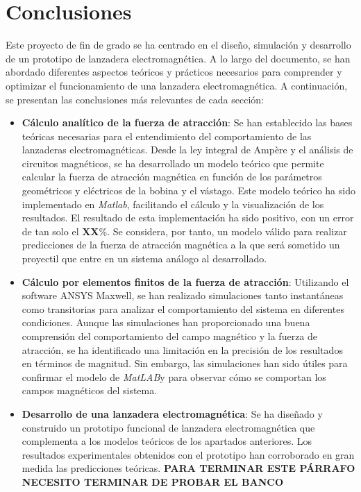 \section{Conclusiones}
\label{sec:conclusiones}

Este proyecto de fin de grado se ha centrado en el diseño, simulación y desarrollo de un prototipo de lanzadera electromagnética. A lo largo del documento, se han abordado diferentes aspectos teóricos y prácticos necesarios para comprender y optimizar el funcionamiento de una lanzadera electromagnética. A continuación, se presentan las conclusiones más relevantes de cada sección:

\begin{itemize}
    \item \textbf{Cálculo analítico de la fuerza de atracción}: Se han establecido las bases teóricas necesarias para el entendimiento del comportamiento de las lanzaderas electromagnéticas. Desde la ley integral de Ampère y el análisis de circuitos magnéticos, se ha desarrollado un modelo teórico que permite calcular la fuerza de atracción magnética en función de los parámetros geométricos y eléctricos de la bobina y el vástago. Este modelo teórico ha sido implementado en \textit{Matlab}\textregistered, facilitando el cálculo y la visualización de los resultados. El resultado de esta implementación ha sido positivo, con un error de tan solo el \textbf{XX}\%. Se considera, por tanto, un modelo válido para realizar predicciones de la fuerza de atracción magnética a la que será sometido un proyectil que entre en un sistema análogo al desarrollado.

    \item \textbf{Cálculo por elementos finitos de la fuerza de atracción}: Utilizando el software ANSYS Maxwell, se han realizado simulaciones tanto instantáneas como transitorias para analizar el comportamiento del sistema en diferentes condiciones. Aunque las simulaciones han proporcionado una buena comprensión del comportamiento del campo magnético y la fuerza de atracción, se ha identificado una limitación en la precisión de los resultados en términos de magnitud. Sin embargo, las simulaciones han sido útiles para confirmar el modelo de \textit{MatLAB}\textregistered y para observar cómo se comportan los campos magnéticos del sistema.

    \item \textbf{Desarrollo de una lanzadera electromagnética}: Se ha diseñado y construido un prototipo funcional de lanzadera electromagnética que complementa a los modelos teóricos de los apartados anteriores. Los resultados experimentales obtenidos con el prototipo han corroborado en gran medida las predicciones teóricas. \textbf{PARA TERMINAR ESTE PÁRRAFO NECESITO TERMINAR DE PROBAR EL BANCO}
    

\end{itemize}
